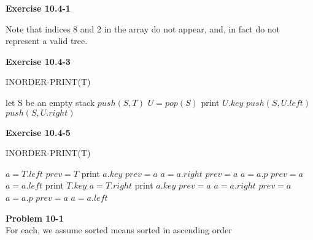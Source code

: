 \documentclass{article}
\begin{document}
\noindent\textbf{ Exercise 10.4-1} \\


Note that indices 8 and 2 in the array do not appear, and, in fact do not represent a valid tree.

\noindent\textbf{ Exercise 10.4-3} \\
\begin{algorithm}
\caption{INORDER-PRINT(T)}
\begin{algorithmic}
\State let S be an empty stack
\State $push(S,T)$
\State $U = pop(S)$
\State print $U.key$
\State $push(S,U.left)$
\State $push(S,U.right)$
\EndIf
\EndWhile
\end{algorithmic}
\end{algorithm}

\noindent\textbf{ Exercise 10.4-5} \\

\begin{algorithm}
\caption{INORDER-PRINT(T)}
\begin{algorithmic}
\State $a = T.left$
\State $prev = T$
\State print $a.key$
\State $prev = a$
\State $a = a.right$
\State $prev = a$
\State $a = a.p$
\State $prev = a$
\State $a = a.left$
\EndIf
\EndWhile
\State print $T.key$
\State $a = T.right$
\State print $a.key$
\State $prev = a$
\State $a = a.right$
\State $prev = a$
\State $a = a.p$
\State $prev = a$
\State $a = a.left$
\EndIf
\EndWhile
\end{algorithmic}
\end{algorithm}



\noindent\textbf{ Problem 10-1} \\

For each, we assume sorted means sorted in ascending order
\end{document}
